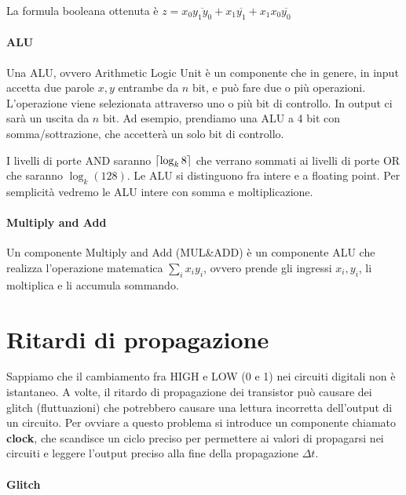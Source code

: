 
La formula booleana ottenuta è $ z = x_0\overbar{y_1y_0} + x_1\overbar{y_1} + x_1x_0\overbar{y_0} $

\paragraph{ALU}
Una ALU, ovvero Arithmetic Logic Unit è un componente che in genere, in input accetta due parole $ x,y $ entrambe da $ n $ bit, e può fare due o più operazioni. L'operazione viene selezionata attraverso uno o più bit di controllo. In output ci sarà un uscita da $ n $ bit. Ad esempio, prendiamo una ALU a 4 bit con somma/sottrazione, che accetterà un solo bit di controllo.


I livelli di porte AND saranno $ \lceil\log_k8\rceil $ che verrano sommati ai livelli di porte OR che saranno $ \log_k(128) $. Le ALU si distinguono fra intere e a floating point. Per semplicità vedremo le ALU intere con somma e moltiplicazione.

\paragraph{Multiply and Add}
Un componente Multiply and Add (MUL\&ADD) è un componente ALU che realizza l'operazione matematica $ \sum_{i}x_iy_i $, ovvero prende gli ingressi $ x_i,y_i $, li moltiplica e li accumula sommando.


\section{Ritardi di propagazione}

Sappiamo che il cambiamento fra HIGH e LOW (0 e 1) nei circuiti digitali non è istantaneo. A volte, il ritardo di propagazione dei transistor può causare dei glitch (fluttuazioni) che potrebbero causare una lettura incorretta dell'output di un circuito. Per ovviare a questo problema si introduce un componente chiamato \textbf{clock}, che scandisce un ciclo preciso per permettere ai valori di propagarsi nei circuiti e leggere l'output preciso alla fine della propagazione $ \Delta t $.


\paragraph{Glitch}

